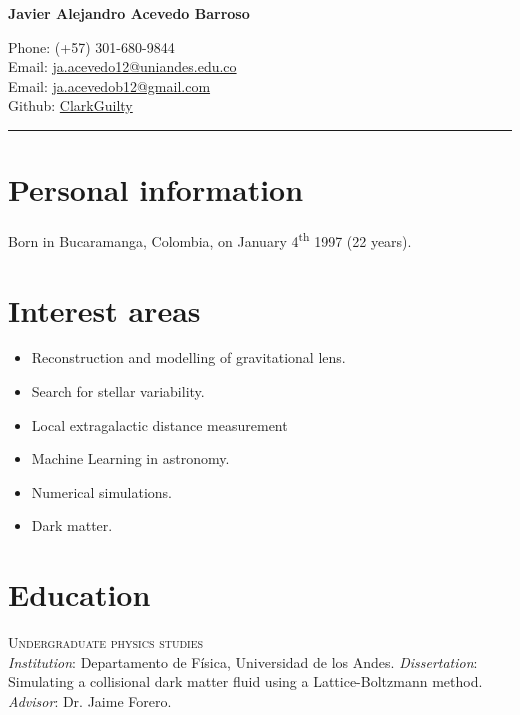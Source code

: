 \documentclass[11pt, a4paper]{article}
\newcommand{\years}[1]{\marginnote{\scriptsize #1}}
\begin{document}
\begin{center}{\huge \bf Javier Alejandro Acevedo Barroso}\\[1cm]\end{center}
\begin{minipage}[t]{0.465\textwidth}
  Phone: (+57) 301-680-9844 \\
  Email: \href{mailto:ja.acevedo12@uniandes.edu.co}{ja.acevedo12@uniandes.edu.co}\\
  Email: \href{mailto:ja.acevedob12@gmail.com}{ja.acevedob12@gmail.com}\\
  Github: \href{https://github.com/ClarkGuilty}{ClarkGuilty}\\
\end{minipage}

\hrule

\section*{Personal information}
Born in Bucaramanga, Colombia, on January 4\textsuperscript{th} 1997 (22 years).

\section*{Interest areas}
\begin{itemize}
\item Reconstruction and modelling of gravitational lens.
\item Search for stellar variability.
\item Local extragalactic distance measurement
\item Machine Learning in astronomy.
\item Numerical simulations.
\item Dark matter.
\end{itemize}

\section*{Education}
\noindent
\years{2015-2019}\textsc{Undergraduate physics studies}\\ {\emph{Institution}}: Departamento de Física, Universidad de los Andes. {\emph{Dissertation}}: Simulating a collisional dark matter fluid using a Lattice-Boltzmann method. {\emph{Advisor}}: Dr. Jaime Forero.\\
\end{document}
